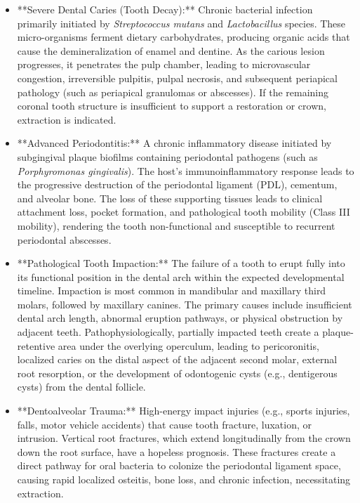 \begin{itemize}
  \item **Severe Dental Caries (Tooth Decay):** Chronic bacterial infection primarily initiated by \textit{Streptococcus mutans} and \textit{Lactobacillus} species. These micro-organisms ferment dietary carbohydrates, producing organic acids that cause the demineralization of enamel and dentine. As the carious lesion progresses, it penetrates the pulp chamber, leading to microvascular congestion, irreversible pulpitis, pulpal necrosis, and subsequent periapical pathology (such as periapical granulomas or abscesses). If the remaining coronal tooth structure is insufficient to support a restoration or crown, extraction is indicated.
  \item **Advanced Periodontitis:** A chronic inflammatory disease initiated by subgingival plaque biofilms containing periodontal pathogens (such as \textit{Porphyromonas gingivalis}). The host's immunoinflammatory response leads to the progressive destruction of the periodontal ligament (PDL), cementum, and alveolar bone. The loss of these supporting tissues leads to clinical attachment loss, pocket formation, and pathological tooth mobility (Class III mobility), rendering the tooth non-functional and susceptible to recurrent periodontal abscesses.
  \item **Pathological Tooth Impaction:** The failure of a tooth to erupt fully into its functional position in the dental arch within the expected developmental timeline. Impaction is most common in mandibular and maxillary third molars, followed by maxillary canines. The primary causes include insufficient dental arch length, abnormal eruption pathways, or physical obstruction by adjacent teeth. Pathophysiologically, partially impacted teeth create a plaque-retentive area under the overlying operculum, leading to pericoronitis, localized caries on the distal aspect of the adjacent second molar, external root resorption, or the development of odontogenic cysts (e.g., dentigerous cysts) from the dental follicle.
  \item **Dentoalveolar Trauma:** High-energy impact injuries (e.g., sports injuries, falls, motor vehicle accidents) that cause tooth fracture, luxation, or intrusion. Vertical root fractures, which extend longitudinally from the crown down the root surface, have a hopeless prognosis. These fractures create a direct pathway for oral bacteria to colonize the periodontal ligament space, causing rapid localized osteitis, bone loss, and chronic infection, necessitating extraction.

\end{itemize}
